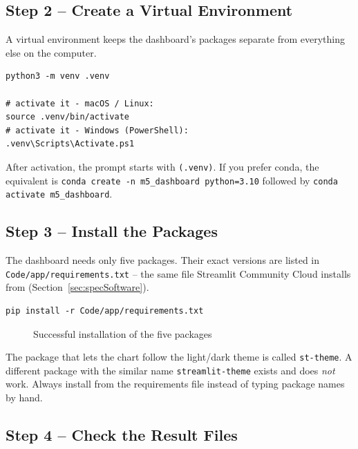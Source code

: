 \subsection{Step 2 -- Create a Virtual Environment}

A virtual environment keeps the dashboard's packages separate from everything else on the computer.

\begin{lstlisting}[style=shell]
python3 -m venv .venv

# activate it - macOS / Linux:
source .venv/bin/activate
# activate it - Windows (PowerShell):
.venv\Scripts\Activate.ps1
\end{lstlisting}

After activation, the prompt starts with \texttt{(.venv)}. If you prefer conda, the equivalent is \texttt{conda create -n m5\_dashboard python=3.10} followed by \texttt{conda activate m5\_dashboard}.

\subsection{Step 3 -- Install the Packages}

The dashboard needs only five packages. Their exact versions are listed in \\
 \texttt{Code/app/requirements.txt} 
 -- the same file Streamlit Community Cloud installs from (Section~\ref{sec:specSoftware}).

\begin{lstlisting}[style=shell]
pip install -r Code/app/requirements.txt
\end{lstlisting}

\begin{figure}[H]
  \centering
  \caption{Successful installation of the five packages}
  \label{fig:localPipInstall}
\end{figure}

\begin{WarningBox}
The package that lets the chart follow the light/dark theme is called \texttt{st-theme}. A different package with the similar name \texttt{streamlit-theme} exists and does \emph{not} work. Always install from the requirements file instead of typing package names by hand.
\end{WarningBox}

\subsection{Step 4 -- Check the Result Files}

